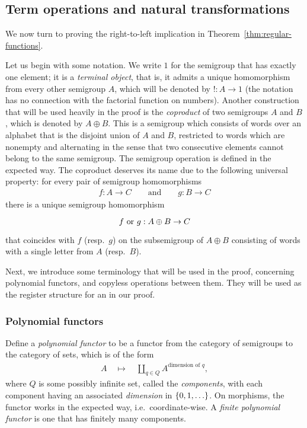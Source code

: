 

\subsection{Term operations and natural transformations}
We now turn to proving the right-to-left implication in Theorem~\ref{thm:regular-functions}.

Let us begin with some notation. We write $1$ for the semigroup that has exactly one element; it is a \emph{terminal object}, that is, it admits a unique homomorphism from every other semigroup $A$, which will be denoted by $! : A \to 1$ (the notation has no connection with the factorial function on numbers). Another construction that will be used heavily in the proof is the \emph{coproduct} of two semigroups $A$ and $B$, which is denoted by $A \oplus B$. This is a semigroup which consists of words over an alphabet that is the disjoint union of $A$ and $B$, restricted to words which are nonempty and alternating in the sense that two consecutive elements cannot belong to the same semigroup. The semigroup operation is defined in the expected way. The coproduct deserves its name due to the following universal property: for every pair of semigroup homomorphisms
\begin{align*}
f : A \to C \qquad \text{and} \qquad g : B \to C
\end{align*}
there is a unique semigroup homomorphism
\[
\begin{tikzcd}
f \text{ or } g : A \oplus B \to C
\end{tikzcd}
\]
that coincides with $f$ (resp.\ $g$) on the subsemigroup of $A \oplus B$ consisting of words with a single letter from $A$ (resp.\ $B$).

Next, we introduce some terminology that will be used in the proof, concerning  polynomial functors, and copyless operations between them. They will be used as the register structure for an \sst in our proof. 

\subsubsection{Polynomial functors}
Define a \emph{polynomial functor} to be a functor from the category of semigroups to the category of sets, which is of the form
\begin{align*}
A \quad \mapsto \quad \coprod_{q \in Q} A^{\text{dimension of } q},
\end{align*}
where $Q$ is some possibly infinite set, called the \emph{components}, with each  component having an associated \emph{dimension} in $\{0,1,\ldots\}$. On morphisms, the functor works in the expected way, i.e.~coordinate-wise.  A \emph{finite polynomial functor} is one that has finitely many components. 

